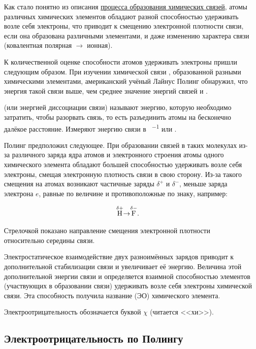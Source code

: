 Как стало понятно из описания \hyperref[sec:introduction_to_chemical_bonding]{процесса образования химических связей}, атомы различных химических элементов обладают разной способностью удерживать возле себя электроны, что приводит к смещению электронной плотности связи, если она образована различными элементами, и даже изменению характера связи (ковалентная полярная $\to$ ионная).

К количественной оценке способности атомов удерживать электроны пришли следующим образом. При изучении химической связи , образованной разными химическими элементами, американский учёный Лайнус Полинг обнаружил, что энергия такой связи выше, чем среднее значение энергий связей  и .

 (или энергией диссоциации связи) называют энергию, которую необходимо затратить, чтобы разорвать связь, то есть разъединить атомы на бесконечно далёкое расстояние. Измеряют энергию связи в \unit{\ruKJ\per\ruMole} или \unit{\ruEV}.

Полинг предположил следующее. При образовании связей в таких молекулах из-за различного заряда ядра атомов и электронного строения атомы одного химического элемента обладают большей способностью удерживать возле себя электроны, смещая электронную плотность связи в свою сторону. Из-за такого смещения на атомах возникают частичные заряды $\delta^{+}$ и $\delta^{-}$, меньше заряда электрона $e$, равные по величине и противоположные по знаку, например:

\begin{equation*}
    \ce{\overset{\delta+}{\text{H}}\bond{->}\overset{\delta-}{\text{F}}}.
\end{equation*}

Стрелочкой показано направление смещения электронной плотности относительно середины связи.

Электростатическое взаимодействие двух разноимённых зарядов приводит к дополнительной стабилизации связи и увеличивает её энергию. Величина этой дополнительной энергии связи и определяется взаимной способностью элементов (участвующих в образовании связи) удерживать возле себя электроны химической связи. Эта способность получила название  (ЭО) химического элемента.

Электроотрицательность обозначается буквой $\chi$ (читается <<хи>>).

\subsection*{Электроотрицательность по Полингу}

